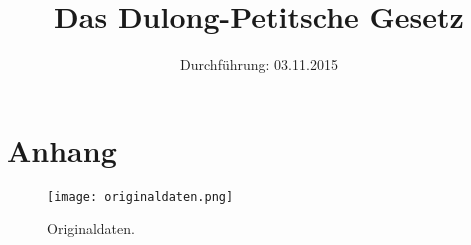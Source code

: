 

\subject{Versuchsprotokoll zum Versuch Nr. 201}
\title{Das Dulong-Petitsche Gesetz}
\date{
  Durchführung: 03.11.2015
}



\maketitle
\newpage






\section{Anhang}
\begin{figure}[H]
  \centering
  \texttt{[image: originaldaten.png]}
  \caption{Originaldaten.}
  \label{fig:original}
\end{figure}

\printbibliography



